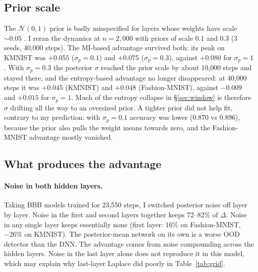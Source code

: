 \documentclass[11pt]{article}
\begin{document}
\subsection{Prior scale}\label{sec:prior}
The $\mathcal N(0,1)$ prior is badly misspecified for layers whose weights have
scale $\sim0.05$ \citep{fortuin2022priors}. I reran the dynamics at $n=2{,}000$
with priors of scale 0.1 and 0.3 (3 seeds, 40{,}000 steps). The MI-based
advantage survived both: its peak on KMNIST was $+0.055$ ($\sigma_p=0.1$) and
$+0.075$ ($\sigma_p=0.3$), against $+0.080$ for $\sigma_p=1$. With $\sigma_p=0.3$
the posterior $\sigma$ reached the prior scale by about 10{,}000 steps and stayed
there, and the entropy-based advantage no longer disappeared: at 40{,}000 steps
it was $+0.045$ (KMNIST) and $+0.048$ (Fashion-MNIST), against $-0.009$ and
$+0.015$ for $\sigma_p=1$. Much of the entropy collapse in \S\ref{sec:window} is
therefore $\sigma$ drifting all the way to an oversized prior. A tighter prior
did not help fit, contrary to my prediction: with $\sigma_p=0.1$ accuracy was
lower (0.870 vs 0.896), because the prior also pulls the weight means towards
zero, and the Fashion-MNIST advantage mostly vanished.

\subsection{What produces the advantage}\label{sec:mechanism}
\paragraph{Noise in both hidden layers.} Taking BBB models trained for 23{,}550 steps,
I switched posterior noise off layer by layer. Noise in the first and second
layers together keeps 72--82\% of $\Delta$. Noise in any single layer keeps
essentially none (first layer: 16\% on Fashion-MNIST, $-26\%$ on KMNIST).
The posterior-mean network on its own is a worse OOD detector than the DNN.
The advantage comes from noise compounding across the hidden layers. Noise
in the last layer alone does not reproduce it in this model, which may explain
why last-layer Laplace did poorly in Table~\ref{tab:grid}.
\end{document}

